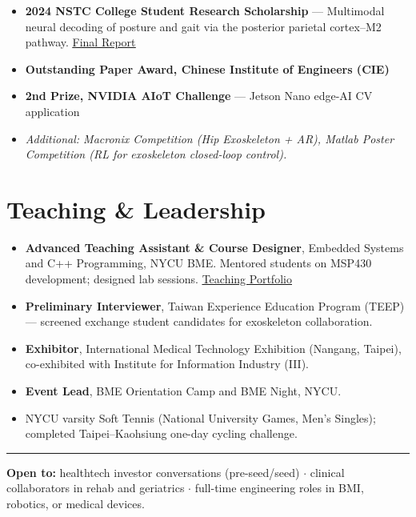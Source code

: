 \documentclass[10pt,a4paper]{article}
\newcommand{\link}[2]{\href{#1}{\underline{#2}}}
\begin{document}
\begin{itemize}
    \item \textbf{2024 NSTC College Student Research Scholarship} — Multimodal neural
    decoding of posture and gait via the posterior parietal cortex–M2 pathway.
    \link{https://YOUR-REPORT}{Final Report}
    \item \textbf{Outstanding Paper Award, Chinese Institute of Engineers (CIE)}
    \item \textbf{2nd Prize, NVIDIA AIoT Challenge} — Jetson Nano edge-AI CV application
    \item \textit{Additional: Macronix Competition (Hip Exoskeleton + AR), Matlab Poster
    Competition (RL for exoskeleton closed-loop control).}
\end{itemize}

\section*{Teaching \& Leadership}

\begin{itemize}
    \item \textbf{Advanced Teaching Assistant \& Course Designer}, Embedded Systems
    and C++ Programming, NYCU BME. Mentored students on MSP430 development;
    designed lab sessions. \link{https://YOUR-PORTFOLIO}{Teaching Portfolio}
    \item \textbf{Preliminary Interviewer}, Taiwan Experience Education Program (TEEP)
    — screened exchange student candidates for exoskeleton collaboration.
    \item \textbf{Exhibitor}, International Medical Technology Exhibition (Nangang,
    Taipei), co-exhibited with Institute for Information Industry (III).
    \item \textbf{Event Lead}, BME Orientation Camp and BME Night, NYCU.
    \item NYCU varsity Soft Tennis (National University Games, Men's Singles);
    completed Taipei–Kaohsiung one-day cycling challenge.
\end{itemize}

\vspace{6pt}
\hrule
\vspace{4pt}
\small
\textbf{Open to:} healthtech investor conversations (pre-seed/seed) $\cdot$
clinical collaborators in rehab and geriatrics $\cdot$
full-time engineering roles in BMI, robotics, or medical devices.
\end{document}
